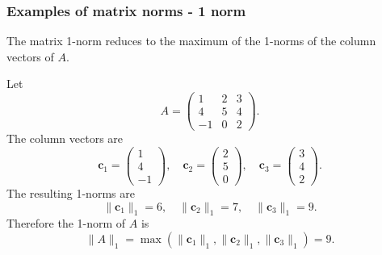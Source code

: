 \documentclass{beamer}
\newcommand{\bfm}[1]{{\boldsymbol{#1}}}
\begin{document}
 \begin{frame}
   \frametitle{Examples of matrix norms - 1 norm}

   The matrix 1-norm reduces to the maximum of the 1-norms of the
   column vectors of $A$. \pause

   Let
   \begin{equation*}
     A =
     \begin{pmatrix}
       1 & 2 & 3 \\
       4 & 5 & 4 \\
       -1 & 0 & 2
     \end{pmatrix}.
   \end{equation*} \pause
   The column vectors are
   \begin{equation*}
     \bfm{c}_1 =
     \begin{pmatrix}
       1 \\ 4 \\ -1
     \end{pmatrix}, \quad
     \bfm{c}_2 =
     \begin{pmatrix}
       2 \\ 5 \\ 0
     \end{pmatrix}, \quad
     \bfm{c}_3 =
     \begin{pmatrix}
       3 \\ 4 \\ 2
     \end{pmatrix}.
   \end{equation*} \pause
   The resulting 1-norms are
   \begin{equation*}
     \| \bfm{c}_1 \|_1 = 6, \quad
     \| \bfm{c}_2 \|_1 = 7, \quad
     \| \bfm{c}_3 \|_1 = 9.
   \end{equation*} \pause
   Therefore the 1-norm of $A$ is
   \begin{equation*}
     \| A \|_1 = \max ( \| \bfm{c}_1 \|_1, \| \bfm{c}_2 \|_1, \| \bfm{c}_3
     \|_1 ) = 9.
   \end{equation*}
 \end{frame}
\end{document}
